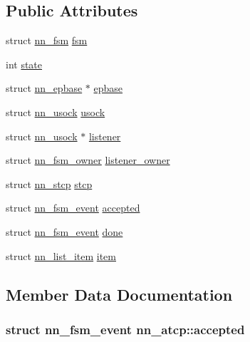 \subsection*{Public Attributes}
\begin{DoxyCompactItemize}
\item 
struct \hyperlink{structnn__fsm}{nn\+\_\+fsm} \hyperlink{structnn__atcp_ad04808fad8020edc6f3eb6e3b29cc793}{fsm}
\item 
int \hyperlink{structnn__atcp_ae28b649a99c4ae7f613d924dcdccc739}{state}
\item 
struct \hyperlink{structnn__epbase}{nn\+\_\+epbase} $\ast$ \hyperlink{structnn__atcp_ac1a71726a1f8735cb9c053f7f853ccdf}{epbase}
\item 
struct \hyperlink{structnn__usock}{nn\+\_\+usock} \hyperlink{structnn__atcp_ad3d53b493bc19478dea4f8b0de9854c5}{usock}
\item 
struct \hyperlink{structnn__usock}{nn\+\_\+usock} $\ast$ \hyperlink{structnn__atcp_a9d4cb8ab1d456ad451669a4563b3460d}{listener}
\item 
struct \hyperlink{structnn__fsm__owner}{nn\+\_\+fsm\+\_\+owner} \hyperlink{structnn__atcp_a78e8bf6c84ec7434898721de359545b7}{listener\+\_\+owner}
\item 
struct \hyperlink{structnn__stcp}{nn\+\_\+stcp} \hyperlink{structnn__atcp_a523f49bc19d9da3b311cff626cec79ff}{stcp}
\item 
struct \hyperlink{structnn__fsm__event}{nn\+\_\+fsm\+\_\+event} \hyperlink{structnn__atcp_a72950d59f755960bf799aad00e145c11}{accepted}
\item 
struct \hyperlink{structnn__fsm__event}{nn\+\_\+fsm\+\_\+event} \hyperlink{structnn__atcp_a4879108dbbc8b71b2bda57a38e41fb4b}{done}
\item 
struct \hyperlink{structnn__list__item}{nn\+\_\+list\+\_\+item} \hyperlink{structnn__atcp_a6fd995526e62b8f65d6848c383b8714c}{item}
\end{DoxyCompactItemize}


\subsection{Member Data Documentation}
\subsubsection[{accepted}]{\setlength{\rightskip}{0pt plus 5cm}struct {\bf nn\+\_\+fsm\+\_\+event} nn\+\_\+atcp\+::accepted}\hypertarget{structnn__atcp_a72950d59f755960bf799aad00e145c11}{}\label{structnn__atcp_a72950d59f755960bf799aad00e145c11}
